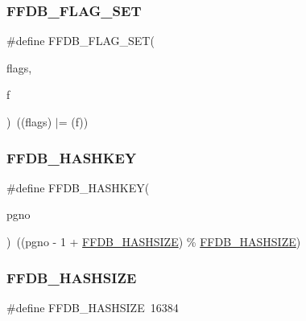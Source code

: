 \mbox{\label{adat-devel_2other__libs_2filedb_2filehash_2ffdb__pagepool_8h_ab71cf0be47170e3d9039fc5b54eb1641}} 
\subsubsection{\texorpdfstring{FFDB\_FLAG\_SET}{FFDB\_FLAG\_SET}}
{\footnotesize\ttfamily \#define F\+F\+D\+B\+\_\+\+F\+L\+A\+G\+\_\+\+S\+ET(\begin{DoxyParamCaption}\item[{}]{flags,  }\item[{}]{f }\end{DoxyParamCaption})~((flags) $\vert$= (f))}

\mbox{\label{adat-devel_2other__libs_2filedb_2filehash_2ffdb__pagepool_8h_a72d9440d281a400a2589035eddd2e012}} 
\subsubsection{\texorpdfstring{FFDB\_HASHKEY}{FFDB\_HASHKEY}}
{\footnotesize\ttfamily \#define F\+F\+D\+B\+\_\+\+H\+A\+S\+H\+K\+EY(\begin{DoxyParamCaption}\item[{}]{pgno }\end{DoxyParamCaption})~((pgno -\/ 1 + \mbox{\hyperlink{adat__devel_2other__libs_2filedb_2filehash_2ffdb__pagepool_8h_abe1c2fbde9b4b6a95b8a164d7479286f}{F\+F\+D\+B\+\_\+\+H\+A\+S\+H\+S\+I\+ZE}}) \% \mbox{\hyperlink{adat__devel_2other__libs_2filedb_2filehash_2ffdb__pagepool_8h_abe1c2fbde9b4b6a95b8a164d7479286f}{F\+F\+D\+B\+\_\+\+H\+A\+S\+H\+S\+I\+ZE}})}

\mbox{\label{adat-devel_2other__libs_2filedb_2filehash_2ffdb__pagepool_8h_abe1c2fbde9b4b6a95b8a164d7479286f}} 
\subsubsection{\texorpdfstring{FFDB\_HASHSIZE}{FFDB\_HASHSIZE}}
{\footnotesize\ttfamily \#define F\+F\+D\+B\+\_\+\+H\+A\+S\+H\+S\+I\+ZE~16384}

